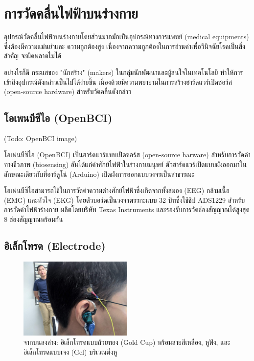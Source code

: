 \section{การวัดคลื่นไฟฟ้าบนร่างกาย}

อุปกรณ์วัดคลื่นไฟฟ้าบนร่างกายโดยส่วนมากมักเป็นอุปกรณ์ทางการแพทย์ (medical equipments) ซึ่งต้องมีความแม่นยำและ
ความถูกต้องสูง เนื่องจากความถูกต้องในการอ่านค่าเพื่อวินิจฉัยโรคเป็นสิ่งสำคัญ จะผิดพลาดไม่ได้

อย่างไรก็ดี กระแสของ "นักสร้าง" (makers) ในกลุ่มนักพัฒนาและผู้สนใจในเทคโนโลยี ทำให้การเข้าถึงอุปกรณ์ดังกล่าวเป็นไปได้ง่ายขึ้น
เนื่องด้วยมีความพยายามในการสร้างฮาร์ดแวร์เปิดซอร์ส (open-source hardware) สำหรับวัดคลื่นดังกล่าว

\subsection{โอเพนบีซีไอ (OpenBCI)}

(Todo: OpenBCI image)
 
โอเพ่นบีซีไอ (OpenBCI) เป็นฮาร์ดแวร์แบบเปิดซอร์ส (open-source harware) สำหรับการวัดค่าทางชีวภาพ (biosensing)
อันได้แก่ค่าศักย์ไฟฟ้าในร่างกายมนุษย์ ตัวฮาร์ดแวร์เปิดแบบผังออกมาในลักษณะเดียวกับที่อาร์ดูโน่ (Arduino)
เปิดผังการออกแบบวงจรเป็นสาธารณะ

โอเพ่นบีซีไอสามารถใช้ในการวัดค่าความต่างศักย์ไฟฟ้าซึ่งเกิดจากทั้งสมอง (EEG) กล้ามเนื้อ (EMG) และหัวใจ (EKG)
โดยตัวบอร์ดเป็นวงจรตรรกะแบบ 32 บิทซึ่งใช้ชิป ADS1229 สำหรับการวัดค่าไฟฟ้าร่างกาย ผลิตโดยบริษัท Texas Instruments
และรองรับการวัดช่องสัญญาณได้สูงสุด 8 ช่องสัญญาณพร้อมกัน

\subsection{อิเล็กโทรด (Electrode)}

\begin{figure}[h]
    \centering
    \includegraphics[width=0.5\textwidth]{images/IMG_20190610_155141.jpg}
    \caption{จากบนลงล่าง: อิเล็กโทรดแบบถ้วยทอง (Gold Cup) พร้อมสายสีเหลือง, หูฟัง, และอิเล็กโทรดแบบเจง (Gel) บริเวณติ่งหู}
\end{figure}


